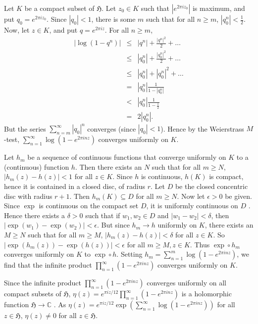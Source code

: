 \documentclass{article}
\begin{document}
Let $K$ be a compact subset of $\mathfrak{H}$.
Let $z_0 \in K$ such that $|e^{2\pi iz_0}|$ is maximum, and put $q_0=e^{2\pi iz_0}$.
Since $|q_0|<1$, there is some $m$ such that for all $n \geq m$, $|q_0^n| < \frac{1}{2}$.
Now, let $z \in K$, and put $q=e^{2\pi iz}$.
For all $n \geq m$,
\begin{eqnarray*}
|\log(1-q^n)|&\leq&|q^n|+\frac{|q^n|^2}{2}+\ldots\\
&\leq&|q_0^n|+\frac{|q_0^n|^2}{2}+\ldots\\
&\leq&|q_0^n|+|q_0^n|^2+\ldots\\
&=&|q_0^n| \frac{1}{1-|q_0^n|}\\
&<&|q_0^n| \frac{1}{1-\frac{1}{2}}\\
&=&2|q_0^n|.
\end{eqnarray*}
But the series $\sum_{n=m}^\infty |q_0|^n$ converges (since $|q_0|<1$). Hence by the Weierstrass $M$-test, $\sum_{n=1}^\infty \log(1-e^{2\pi inz})$ converges uniformly on $K$.

Let $h_m$ be a sequence of continuous functions that converge uniformly on $K$ to a (continuous) function $h$. Then
there exists an $N$ such that for all $m \geq N$, $|h_m(z)-h(z)|<1$ for all $z \in K$.
Since $h$ is continuous, $h(K)$ is compact, hence it is contained in a closed disc, of radius $r$. Let $D$ be the closed concentric disc with radius $r+1$. Then $h_m(K) \subseteq D$ for all $m \geq N$. Now let $\epsilon>0$ be given. Since $\exp$ is continuous on the compact set $D$, it is uniformly continuous on $D$ \cite[Theorem 4.19]{MR0385023}. Hence there exists a $\delta>0$ such that if $w_1,w_2 \in D$ and $|w_1-w_2|<\delta$, then $|\exp(w_1)-\exp(w_2)|<\epsilon$.
But since $h_m \to h$ uniformly on $K$, there exists an $M \geq N$ such that for all $m \geq M$, $|h_m(z)-h(z)|<\delta$ for all $z \in K$. So $|\exp(h_m(z))-\exp(h(z))|<\epsilon$ for all $m \geq M, z \in K$. Thus ${\exp}\circ h_m$ converges uniformly on $K$ to ${\exp}\circ h$.
Setting $h_m=\sum_{n=1}^m \log(1-e^{2\pi inz})$, we find that the infinite product $\prod_{n=1}^\infty (1-e^{2\pi inz})$ converges uniformly on $K$.

Since the infinite product $\prod_{n=1}^\infty (1-e^{2\pi inz})$ converges uniformly on all compact subsets of $\mathfrak{H}$, 
$\eta(z)=e^{\pi iz/12}\prod_{n=1}^\infty (1-e^{2\pi inz})$ is a holomorphic function $\mathfrak{H} \to \mathbb{C}$ \cite[Chapter V, Theorem 1.1]{MR1659317}.
As $\eta(z)=e^{\pi iz/12}\exp(\sum_{n=1}^\infty \log(1-e^{2\pi inz}))$ for all $z \in \mathfrak{H}$, $\eta(z) \neq 0$ for all $z \in \mathfrak{H}$.
\end{document}
